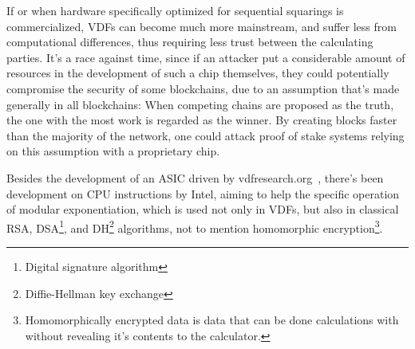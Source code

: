 If or when hardware specifically optimized for sequential squarings is commercialized, VDFs can become much more mainstream, and suffer less from computational differences, thus requiring less trust between the calculating parties. It's a race against time, since if an attacker put a considerable amount of resources in the development of such a chip themselves, they could potentially compromise the security of some blockchains, due to an assumption that's made generally in all blockchains: When competing chains are proposed as the truth, the one with the most work is regarded as the winner. By creating blocks faster than the majority of the network, one could attack proof of stake systems relying on this assumption with a proprietary chip.

Besides the development of an ASIC driven by vdfresearch.org~\cite{noauthor_undated-hk}, there's been development on CPU instructions by Intel, aiming to help the specific operation of modular exponentiation, which is used not only in VDFs, but also in classical RSA, DSA\footnote{Digital signature algorithm}, and DH\footnote{Diffie-Hellman key exchange} algorithms, not to mention homomorphic encryption\footnote{Homomorphically encrypted data is data that can be done calculations with without revealing it's contents to the calculator.}.~\cite{Drucker2019-cx}
